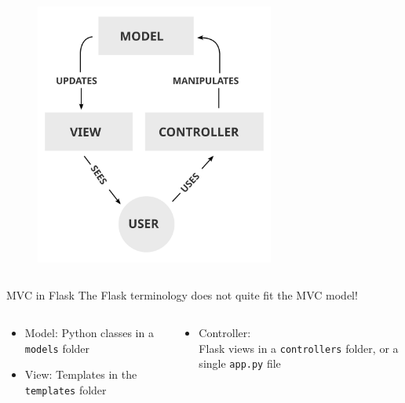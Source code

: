 \documentclass[fleqn,aspectratio=169,10pt]{beamer}
\begin{document}
\begin{frame}[fragile]
\begin{columns}
\begin{column}{.4\linewidth}
\begin{figure}[]
        \includegraphics[width=0.7\textwidth]{mvc}
      \end{figure}
    \end{column}
  \end{columns}
  \pause
  \vspace*{-1ex}

  \begin{block}{MVC in Flask}
    The Flask terminology does not quite fit the MVC model! \\
  \vspace*{-2ex}
    \begin{columns}
      \begin{column}{.5\textwidth}
    \begin{itemize}
      \item Model: Python classes in a \texttt{models} folder
      \item View: Templates in the \texttt{templates} folder
    \end{itemize}
      \end{column}
      \begin{column}{.5\textwidth}
    \begin{itemize}
      \item Controller: \\ Flask views in a \texttt{controllers} folder, or a single \texttt{app.py} file
    \end{itemize}
      \end{column}
    \end{columns}
  \vspace*{-.5ex}
  \end{block}
\end{frame}
\end{document}
